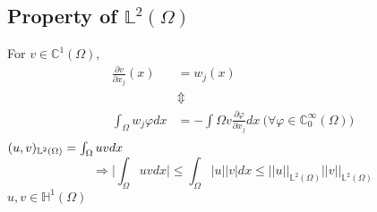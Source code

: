 \documentclass[a4paper,12pt]{article}
\newcommand{\C}{\mathbb{C}}
\newcommand{\Hspace}{\mathbb{H}}
\newcommand{\Lspace}{\mathbb{L}}
\begin{document}
\subsection{Property of $\Lspace^2(\Omega)$}
For $v \in \C^1(\Omega),$
\begin{equation}\nonumber
\begin{aligned}
\frac{\partial v}{\partial x_j}(x)&=w_j(x)\\
&\Updownarrow\\
\int_\Omega w_j\varphi dx &= -\int\Omega v \frac{\partial \varphi}{\partial x_j} dx\ \big(\forall\varphi\in\C_0^\infty(\Omega)\big)\\
\end{aligned}
\end{equation}
$(u,v)_{\Lspace^2(\Omega)} = \int_\Omega uv dx\\$
\begin{equation}\nonumber
\Rightarrow \bigg|\int_{\Omega}uvdx\bigg| \leq \int_{\Omega}|u||v|dx \leq ||u||_{\Lspace^2(\Omega)} ||v||_{\Lspace^2(\Omega)}
\end{equation}
$u,v \in \Hspace^1(\Omega)$
\end{document}
